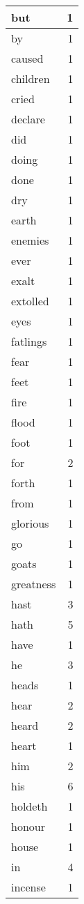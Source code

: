 \begin{center}
\begin{longtable}{l|r}
but & 1 \\ \hline
by & 1 \\ \hline
caused & 1 \\ \hline
children & 1 \\ \hline
cried & 1 \\ \hline
declare & 1 \\ \hline
did & 1 \\ \hline
doing & 1 \\ \hline
done & 1 \\ \hline
dry & 1 \\ \hline
earth & 1 \\ \hline
enemies & 1 \\ \hline
ever & 1 \\ \hline
exalt & 1 \\ \hline
extolled & 1 \\ \hline
eyes & 1 \\ \hline
fatlings & 1 \\ \hline
fear & 1 \\ \hline
feet & 1 \\ \hline
fire & 1 \\ \hline
flood & 1 \\ \hline
foot & 1 \\ \hline
for & 2 \\ \hline
forth & 1 \\ \hline
from & 1 \\ \hline
glorious & 1 \\ \hline
go & 1 \\ \hline
goats & 1 \\ \hline
greatness & 1 \\ \hline
hast & 3 \\ \hline
hath & 5 \\ \hline
have & 1 \\ \hline
he & 3 \\ \hline
heads & 1 \\ \hline
hear & 2 \\ \hline
heard & 2 \\ \hline
heart & 1 \\ \hline
him & 2 \\ \hline
his & 6 \\ \hline
holdeth & 1 \\ \hline
honour & 1 \\ \hline
house & 1 \\ \hline
in & 4 \\ \hline
incense & 1 \\ \hline

\end{longtable}
\end{center}
